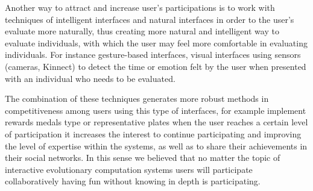 Another way to attract and increase user’s participations is to work with
techniques of intelligent interfaces and natural interfaces in order to the
user's evaluate more naturally, thus creating more natural and intelligent way
to evaluate individuals, with which the user may feel more comfortable in
evaluating individuals. For instance  gesture-based interfaces, visual
interfaces using sensors (cameras, Kinnect) to detect the time or emotion felt
by the user when presented with an individual who needs to be evaluated.

The combination of these techniques generates more robust methods in
competitiveness among users using this type of  interfaces, for example
implement rewards medals type or representative plates when the user reaches a
certain level of participation it increases the interest to continue
participating and improving the level of expertise within the systems, as well
as to share their achievements in their social networks. In this sense we
believed that no matter the topic of interactive evolutionary computation
systems users will participate collaboratively having fun without knowing in
depth is participating.
